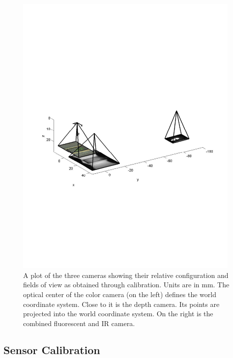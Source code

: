 

\begin{figure}
  \includegraphics[width=11cm,trim=20 240 20 300,clip]{Figures/CameraConfiguration}
\caption{A plot of the three cameras showing their relative configuration and fields of view as obtained through calibration.  Units are in mm.  The optical center of the color camera (on the left) defines the world coordinate system.  Close to it is the depth camera.  Its points are projected into the world coordinate system.  On the right is the combined fluorescent and IR camera.}
\label{fig:CameraConfiguration}
\end{figure}


\subsection{Sensor Calibration}

